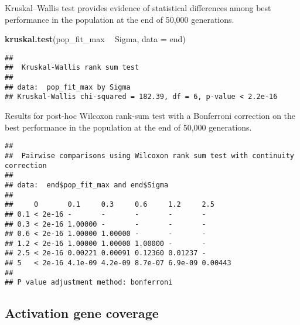 \documentclass[]{book}
\newenvironment{Shaded}{\begin{snugshade}}{\end{snugshade}}
\newcommand{\DataTypeTok}[1]{\textcolor[rgb]{0.13,0.29,0.53}{#1}}
\newcommand{\KeywordTok}[1]{\textcolor[rgb]{0.13,0.29,0.53}{\textbf{#1}}}
\newcommand{\NormalTok}[1]{#1}
\newcommand{\OperatorTok}[1]{\textcolor[rgb]{0.81,0.36,0.00}{\textbf{#1}}}
\newcommand{\OtherTok}[1]{\textcolor[rgb]{0.56,0.35,0.01}{#1}}
\newcommand{\StringTok}[1]{\textcolor[rgb]{0.31,0.60,0.02}{#1}}
\begin{document}
Kruskal--Wallis test provides evidence of statistical differences among best performance in the population at the end of 50,000 generations.

\begin{Shaded}
\begin{Highlighting}[]
\KeywordTok{kruskal.test}\NormalTok{(pop_fit_max }\OperatorTok{~}\StringTok{ }\NormalTok{Sigma, }\DataTypeTok{data =}\NormalTok{ end)}
\end{Highlighting}
\end{Shaded}

\begin{verbatim}
## 
##  Kruskal-Wallis rank sum test
## 
## data:  pop_fit_max by Sigma
## Kruskal-Wallis chi-squared = 182.39, df = 6, p-value < 2.2e-16
\end{verbatim}

Results for post-hoc Wilcoxon rank-sum test with a Bonferroni correction on the best performance in the population at the end of 50,000 generations.

\begin{Shaded}
\end{Shaded}

\begin{verbatim}
## 
##  Pairwise comparisons using Wilcoxon rank sum test with continuity correction 
## 
## data:  end$pop_fit_max and end$Sigma 
## 
##     0       0.1     0.3     0.6     1.2     2.5    
## 0.1 < 2e-16 -       -       -       -       -      
## 0.3 < 2e-16 1.00000 -       -       -       -      
## 0.6 < 2e-16 1.00000 1.00000 -       -       -      
## 1.2 < 2e-16 1.00000 1.00000 1.00000 -       -      
## 2.5 < 2e-16 0.00221 0.00091 0.12360 0.01237 -      
## 5   < 2e-16 4.1e-09 4.2e-09 8.7e-07 6.9e-09 0.00443
## 
## P value adjustment method: bonferroni
\end{verbatim}

\hypertarget{activation-gene-coverage-11}{%
\subsection{Activation gene coverage}\label{activation-gene-coverage-11}}
\end{document}
